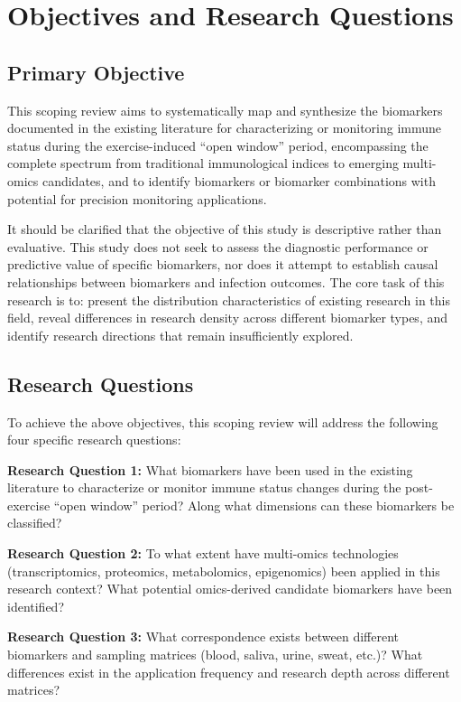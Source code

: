 \documentclass[12pt,a4paper]{article}
\newcommand{\openwindow}{``open window''}
\begin{document}
\section{Objectives and Research Questions}

\subsection{Primary Objective}

This scoping review aims to systematically map and synthesize the biomarkers documented in the existing literature for characterizing or monitoring immune status during the exercise-induced \openwindow{} period, encompassing the complete spectrum from traditional immunological indices to emerging multi-omics candidates, and to identify biomarkers or biomarker combinations with potential for precision monitoring applications.

It should be clarified that the objective of this study is descriptive rather than evaluative. This study does not seek to assess the diagnostic performance or predictive value of specific biomarkers, nor does it attempt to establish causal relationships between biomarkers and infection outcomes. The core task of this research is to: present the distribution characteristics of existing research in this field, reveal differences in research density across different biomarker types, and identify research directions that remain insufficiently explored.

\subsection{Research Questions}

To achieve the above objectives, this scoping review will address the following four specific research questions:

\textbf{Research Question 1:} What biomarkers have been used in the existing literature to characterize or monitor immune status changes during the post-exercise \openwindow{} period? Along what dimensions can these biomarkers be classified?

\textbf{Research Question 2:} To what extent have multi-omics technologies (transcriptomics, proteomics, metabolomics, epigenomics) been applied in this research context? What potential omics-derived candidate biomarkers have been identified?

\textbf{Research Question 3:} What correspondence exists between different biomarkers and sampling matrices (blood, saliva, urine, sweat, etc.)? What differences exist in the application frequency and research depth across different matrices?
\end{document}

